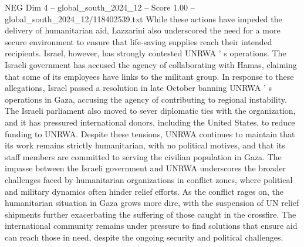 \begin{textsample}{NEG Dim 4 – global\_south\_2024\_12 – Score 1.00 – global\_south\_2024\_12/118402539.txt}
While these actions have impeded the delivery of humanitarian aid, Lazzarini also underscored the need for a more secure environment to ensure that life-saving supplies reach their intended recipients.
Israel, however, has strongly contested UNRWA ' s operations.
The Israeli government has accused the agency of collaborating with Hamas, claiming that some of its employees have links to the militant group.
In response to these allegations, Israel passed a resolution in late October banning UNRWA ' s operations in Gaza, accusing the agency of contributing to regional instability.
The Israeli parliament also moved to sever diplomatic ties with the organization, and it has pressured international donors, including the United States, to reduce funding to UNRWA.
Despite these tensions, UNRWA continues to maintain that its work remains strictly humanitarian, with no political motives, and that its staff members are committed to serving the civilian population in Gaza.
The impasse between the Israeli government and UNRWA underscores the broader challenges faced by humanitarian organizations in conflict zones, where political and military dynamics often hinder relief efforts.
As the conflict rages on, the humanitarian situation in Gaza grows more dire, with the suspension of UN relief shipments further exacerbating the suffering of those caught in the crossfire.
The international community remains under pressure to find solutions that ensure aid can reach those in need, despite the ongoing security and political challenges.

\end{textsample}
